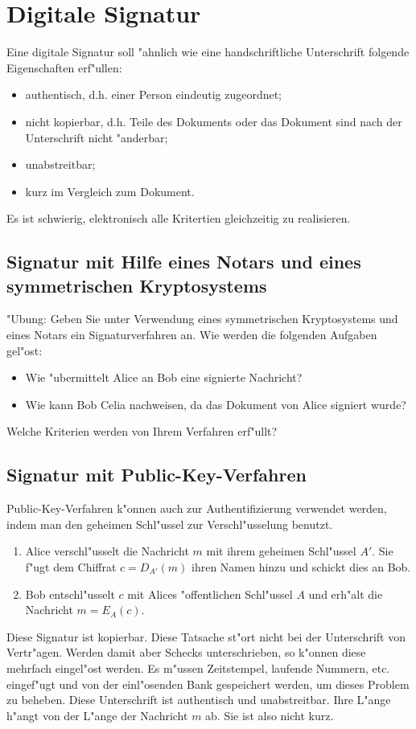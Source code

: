 \section{Digitale Signatur}

Eine digitale Signatur soll "ahnlich wie eine handschriftliche Unterschrift 
folgende Eigenschaften erf"ullen:
\begin{itemize}
  \item authentisch, d.h. einer Person eindeutig zugeordnet;
  \item nicht kopierbar, d.h. Teile des Dokuments oder das Dokument sind
    nach der Unterschrift nicht "anderbar;
  \item unabstreitbar;
  \item kurz im Vergleich zum Dokument.
\end{itemize}
Es ist schwierig, elektronisch alle Kritertien gleichzeitig zu realisieren.


\subsection{Signatur mit Hilfe eines Notars und eines symmetrischen Kryptosystems} 

"Ubung: Geben Sie unter Verwendung eines symmetrischen Kryptosystems
und eines Notars ein Signaturverfahren an. Wie werden die folgenden
Aufgaben gel"ost:

\begin{itemize}
   \item Wie "ubermittelt Alice an Bob eine signierte Nachricht?
   \item Wie kann Bob Celia nachweisen, da\3 das Dokument von Alice signiert wurde?
\end{itemize}
Welche Kriterien werden von Ihrem Verfahren erf"ullt?


\subsection{Signatur mit Public-Key-Verfahren}

Public-Key-Verfahren k"onnen auch zur Authentifizierung verwendet
werden, indem man den geheimen Schl"ussel zur Verschl"usselung benutzt.
\begin{enumerate}
  \item Alice verschl"usselt die Nachricht $m$ mit ihrem geheimen
        Schl"ussel $A'$. Sie f"ugt dem Chiffrat $c=D_{A'}(m)$ 
        ihren Namen hinzu und schickt dies an Bob.
  \item Bob entschl"usselt $c$ mit Alices "offentlichen Schl"ussel 
        $A$ und erh"alt die Nachricht $m=E_A(c)$.
\end{enumerate}
Diese Signatur ist kopierbar. Diese Tatsache st"ort nicht bei der 
Unterschrift von Vertr"agen. Werden damit aber Schecks unterschrieben, so 
k"onnen diese mehrfach eingel"ost werden. Es m"ussen Zeitstempel, laufende 
Nummern, etc. eingef"ugt und von der einl"osenden Bank gespeichert werden, um
dieses Problem zu beheben. Diese Unterschrift ist authentisch und
unabstreitbar. Ihre L"ange h"angt von der L"ange der Nachricht $m$ ab.
Sie ist also nicht kurz.

